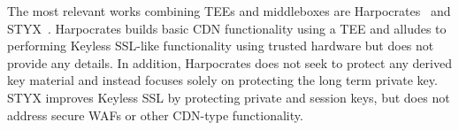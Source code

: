 The most relevant works combining TEEs and middleboxes are
Harpocrates~\cite{ahmed2018harpocrates} and STYX~\cite{wei2017styx}.
%
Harpocrates builds basic CDN functionality using a TEE and alludes to
performing Keyless SSL-like functionality using trusted hardware but does not
provide any details.
%
In addition, Harpocrates does not seek to protect any derived key material and
instead focuses solely on protecting the long term private key.
%
STYX improves Keyless SSL by protecting private and session keys, but does not
address secure WAFs or other CDN-type functionality.







